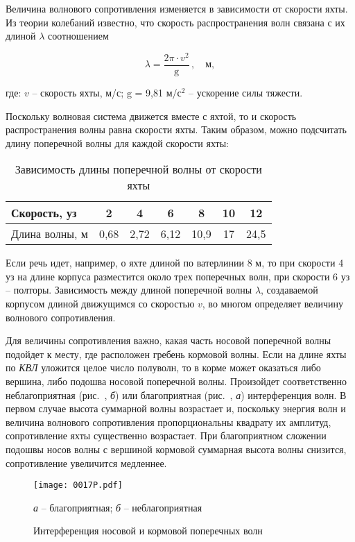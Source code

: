 Величина волнового сопротивления изменяется в зависимости от скорости яхты. Из теории колебаний известно, что скорость распространения волн связана с их длиной $\lambda$ соотношением

\begin{equation}
  \lambda = \frac{2 \pi \cdot v^2}{\mathrm g}\,, \quad \text{м},
\end{equation}

где: $v$ \--- скорость яхты, м/с; $\mathrm g$ = 9,81 м/с$^2$ \--- ускорение силы тяжести. 

Поскольку волновая система движется вместе с яхтой, то и скорость распространения волны равна скорости яхты. Таким образом, можно подсчитать длину поперечной волны для каждой скорости яхты:

\begin{table*}[htb]
  \small
  \centering
  \begin{tabular}{l|c|c|c|c|c|c}
    \toprule
    Скорость, уз & 2 & 4 & 6 & 8 & 10 & 12 \\
    \midrule
    Длина волны, м & 0,68 & 2,72 & 6,12 & 10,9 & 17 & 24,5 \\
    \bottomrule
  \end{tabular}
  \caption{Зависимость длины поперечной волны от скорости яхты}
  \label{tab:1-2}
\end{table*}

Если речь идет, например, о яхте длиной по ватерлинии 8 м, то при скорости 4 уз на длине корпуса разместится около трех поперечных волн, при скорости 6 уз \--- полторы. Зависимость между длиной поперечной волны $\lambda$, создаваемой корпусом длиной \lkvl движущимся со скоростью $v$, во многом определяет величину волнового сопротивления. 

Для величины сопротивления важно, какая часть носовой поперечной волны подойдет к месту, где расположен гребень кормовой волны. Если на длине яхты по \textit{КВЛ} уложится целое число полуволн, то в корме может оказаться либо вершина, либо подошва носовой поперечной волны. Произойдет соответственно неблагоприятная (рис.~, \textit{б}) или благоприятная (рис.~, \textit{а}) интерференция волн. В первом случае высота суммарной волны возрастает и, поскольку энергия волн и величина волнового сопротивления пропорциональны квадрату их амплитуд, сопротивление яхты существенно возрастает. При благоприятном сложении подошвы носов волны с вершиной кормовой суммарная высота волны снизится, сопротивление увеличится медленнее.

\begin{figure*}[htb]
  \centering
  \texttt{[image: 0017P.pdf]}
  \caption{Интерференция носовой и кормовой поперечных волн}
  \label{fig:17}
  \centering
  \small
  \textit{а} \--- благоприятная;
  \textit{б} \--- неблагоприятная
\end{figure*}

